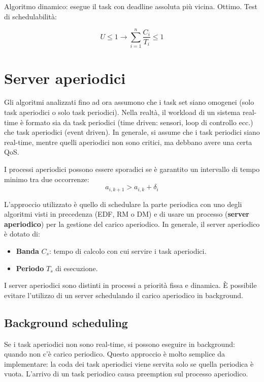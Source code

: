 \documentclass[11pt,a4paper]{report}
\begin{document}
Algoritmo dinamico: esegue il task con deadline assoluta più vicina. Ottimo. Test di schedulabilità:

\begin{equation}
U \leq 1 \to \sum_{i=1}^n\frac{C_i}{T_i} \leq 1
\end{equation}

\section{Server aperiodici}

Gli algoritmi analizzati fino ad ora assumono che i task set siano omogenei (solo task aperiodici o solo task periodici). Nella realtà, il workload di un sistema real-time è formato sia da task periodici (time driven: sensori, loop di controllo ecc.) che task aperiodici (event driven). In generale, si assume che i task periodici siano real-time, mentre quelli aperiodici non sono critici, ma debbano avere una certa QoS.

I processi aperiodici possono essere sporadici se è garantito un intervallo di tempo minimo tra due occorrenze:
\[ a_{i,k+1} > a_{i,k} + \delta_i \]

L'approccio utilizzato è quello di schedulare la parte periodica con uno degli algoritmi visti in precedenza (EDF, RM o DM) e di usare un processo (\textbf{server aperiodico}) per la gestione del carico aperiodico. In generale, il server aperiodico è dotato di:
\begin{itemize}
    \item \textbf{Banda} $C_s$: tempo di calcolo con cui servire i task aperiodici.
    \item \textbf{Periodo} $T_s$ di esecuzione.
\end{itemize}

I server aperiodici sono distinti in processi a priorità fissa e dinamica. È possibile evitare l'utilizzo di un server schedulando il carico aperiodico in background.

\subsection{Background scheduling}

Se i task aperiodici non sono real-time, si possono eseguire in background: quando non c'è carico periodico. Questo approccio è molto semplice da implementare: la coda dei task aperiodici viene servita solo se quella periodica è vuota. L'arrivo di un task periodico causa preemption sul processo aperiodico.
\end{document}
